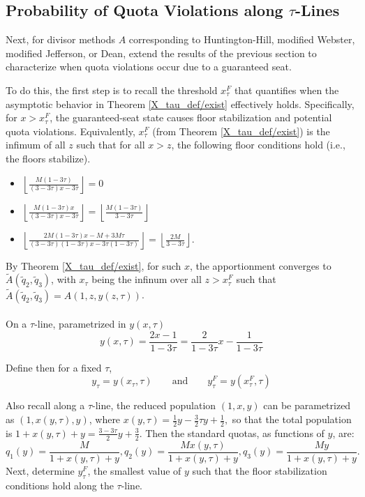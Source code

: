 \documentclass[11pt]{article}
\theoremstyle{definition}
\theoremstyle{definition}
\begin{document}

\subsection{Probability of Quota Violations along $\tau$-Lines }

Next, for divisor methods $A$ corresponding to Huntington-Hill, modified Webster, modified Jefferson, or Dean, extend the results of the previous section to characterize when quota violations occur due to a guaranteed seat. 

To do this, the first step is to recall the threshold $x_\tau^F$ that quantifies when the asymptotic behavior in Theorem \ref{X_tau_def/exist} effectively holds. Specifically, for $x> x_\tau^F$, the guaranteed-seat state causes floor stabilization and potential quota violations. Equivalently, $x_{\tau}^F$ (from Theorem \ref{X_tau_def/exist}) is the infimum of all $z$ such that for all $x > z$, the following floor conditions hold (i.e., the floors stabilize).
\begin{itemize}
\item $\left\lfloor \frac{M(1-3\tau)}{(3-3\tau)x-3\tau} \right\rfloor = 0$

\item $\left\lfloor \frac{M(1-3\tau)x}{(3-3\tau)x-3\tau} \right\rfloor = \left\lfloor \frac{M(1-3\tau)}{3-3\tau} \right\rfloor$

\item $\left\lfloor \frac{2M(1-3\tau)x - M + 3M\tau}{(3-3\tau)(1-3\tau)x - 3\tau(1-3\tau)} \right\rfloor = \left\lfloor \frac{2M}{3-3\tau} \right\rfloor.$
\end{itemize}

By Theorem \ref{X_tau_def/exist}, for such $x$, the apportionment converges to $\tilde{A}(\tilde{q}_2, \tilde{q}_3)$, with $x_\tau$ being the infinum over all $z > x_\tau^F$ such that $\tilde{A}(\tilde{q}_2, \tilde{q}_3)=A(1,z,y(z,\tau))$. \\
\\
On a $\tau$-line, parametrized in $y(x,\tau)$
$$ y(x,\tau)= \frac{2x-1}{1-3\tau} = \frac{2}{1-3\tau}x - \frac{1}{1-3\tau} $$

Define then for a fixed $\tau$,
$$ y_\tau = y(x_\tau,\tau) \qquad\text{and}\qquad y_\tau^F = y(x_\tau^F,\tau)$$

Also recall along a $\tau$-line, the reduced population $(1,x,y)$ can be parametrized as $(1,x(y,\tau),y)$, where $x(y, \tau) = \frac{1}{2}y - \frac{3}{2}\tau y + \frac{1}{2},$ so that the total population is $1 + x(y,\tau) + y = \frac{3-3\tau}{2}y + \frac32$. Then the standard quotas, as functions of $y$, are: 
$$ q_1(y) = \frac{M}{1 + x(y,\tau) + y}, q_2(y) = \frac{Mx(y,\tau)}{1 + x(y,\tau)+y}, q_3(y) = \frac{My}{1 + x(y,\tau) + y}. $$
Next, determine $y_\tau^F$, the smallest value of $y$ such that the floor stabilization conditions hold along the $\tau$-line. 
\end{document}
